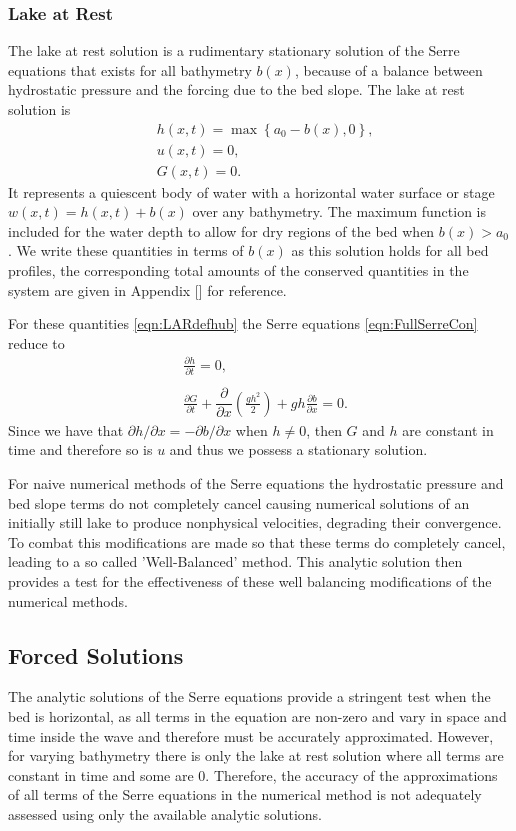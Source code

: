 \subsubsection{Lake at Rest}
The lake at rest solution is a rudimentary stationary solution of the Serre equations that exists for all bathymetry $b(x)$, because of a balance between hydrostatic pressure and the forcing due to the bed slope. The lake at rest solution is
\begin{subequations}
	\begin{align}
	&h(x,t) = \max\left\lbrace a_0 - b(x), 0 \right\rbrace, \\
	&u(x,t) = 0 , \\
	&G(x,t) = 0 .
	\end{align}
	\label{eqn:LARdefhub}
\end{subequations}
It represents a quiescent body of water with a horizontal water surface or stage $w(x,t) = h(x,t) + b(x)$ over any bathymetry. The maximum function is included for the water depth to allow for dry regions of the bed when $b(x) > a_0$. We write these quantities in terms of $b(x)$ as this solution holds for all bed profiles, the corresponding total amounts of the conserved quantities in the system are given in Appendix [] for reference. 

For these quantities \eqref{eqn:LARdefhub} the Serre equations \eqref{eqn:FullSerreCon} reduce to
\begin{align*}
& \frac{\partial h}{\partial t}  = 0 , \\  \nonumber \\
&\frac{\partial G}{\partial t}  +\dfrac{\partial}{\partial x} \left(\frac{gh^2}{2}\right) + gh \frac{\partial b}{\partial x} = 0.
\end{align*}
Since we have that $\partial h / \partial x =  - \partial b / \partial x$ when $h \neq 0$, then $G$ and $h$ are constant in time and therefore so is $u$ and thus we possess a stationary solution. 

For naive numerical methods of the Serre equations the hydrostatic pressure and bed slope terms do not completely cancel causing numerical solutions of an initially still lake to produce nonphysical velocities, degrading their convergence. To combat this modifications are made so that these terms do completely cancel, leading to a so called 'Well-Balanced' method. This analytic solution then provides a test for the effectiveness of these well balancing modifications of the numerical methods.


\subsection{Forced Solutions}
The analytic solutions of the Serre equations provide a stringent test when the bed is horizontal, as all terms in the equation are non-zero and vary in space and time inside the wave and therefore must be accurately approximated. However, for varying bathymetry there is only the lake at rest solution where all terms are constant in time and some are $0$. Therefore, the accuracy of the approximations of all terms of the Serre equations in the numerical method is not adequately assessed using only the available analytic solutions.

